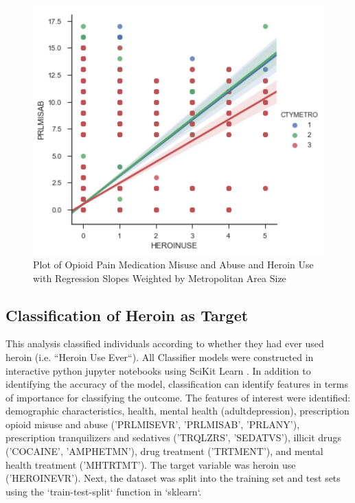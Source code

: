 \documentclass[sigconf]{acmart}
\begin{document}
\begin{figure}[!ht]
  \centering\includegraphics[width=\columnwidth]{images/Figure2.pdf}
  \caption{Plot of Opioid Pain Medication Misuse and Abuse and Heroin Use
  with Regression Slopes Weighted by Metropolitan Area Size}
  \label{f:Figure2}
\end{figure}


\subsection{Classification of Heroin as Target \cite{muller17}}

This analysis classified individuals according to whether they had ever used 
heroin  (i.e. ``Heroin Use Ever``). All Classifier models were constructed in 
interactive python jupyter notebooks using SciKit Learn \cite{logclassH}. 
In addition to identifying the accuracy of the model, classification can 
identify features in terms of importance for classifying the outcome. The 
features of interest were identified: demographic characteristics, health, 
mental health (adultdepression), prescription opioid misuse and abuse 
('PRLMISEVR', 'PRLMISAB', 'PRLANY'), prescription tranquilizers and sedatives 
('TRQLZRS', 'SEDATVS'), illicit drugs ('COCAINE', 'AMPHETMN'), drug treatment 
('TRTMENT'), and mental health treatment ('MHTRTMT'). The target variable was 
heroin use ('HEROINEVR'). Next, the dataset was split into the training set 
and test sets using the `train-test-split` function in `sklearn`.
\end{document}
